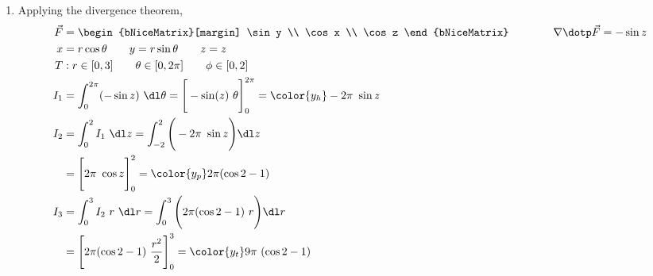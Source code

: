 \begin{enumerate}
    \item Applying the divergence theorem,
          \begin{align}
              \vec{F} & = \begin{bNiceMatrix}[margin]
                              \sin y \\ \cos x \\ \cos z
                          \end{bNiceMatrix} \qquad\qquad
              \nabla \dotp \vec{F} = -\sin z                                     \\
              x       & = r\cos \theta \qquad y = r\sin \theta
              \qquad z = z                                                       \\
              T       & : r \in [0, 3] \qquad \theta \in [0, 2\pi]
              \qquad \phi \in [0, 2]                                             \\
              I_1     & = \int_{0}^{2\pi} (-\sin z) \ \dl \theta
              = \Bigg[ -\sin(z)\ \theta \Bigg]_{0}^{2\pi}
              = {\color{y_h} -2\pi\ \sin z}                                      \\
              I_2     & = \int_{0}^{2} I_1 \ \dl z
              = \int_{-2}^{2} \Bigg( -2\pi\ \sin z \Bigg) \dl z                  \\
                      & = \Bigg[ 2\pi\ \cos z \Bigg]_{0}^{2}
              = {\color{y_p} 2\pi (\cos 2 - 1) }                                 \\
              I_3     & = \int_{0}^{3} I_2\ r\ \dl r = \int_{0}^{3}
              \Bigg( 2\pi (\cos 2 - 1)\ r \Bigg) \dl r                           \\
                      & = \Bigg[ 2\pi (\cos 2 - 1)\ \frac{r^2}{2} \Bigg]_{0}^{3}
              = {\color{y_t} 9\pi\ (\cos 2 - 1)}
          \end{align}


\end{enumerate}
